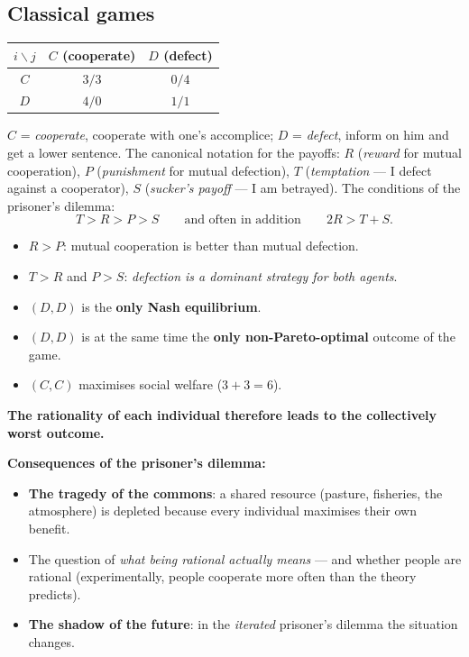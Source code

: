 \documentclass[11pt,a4paper]{article}
\theoremstyle{definition}
\begin{document}
\subsection{Classical games}

\begin{defbox}
\begin{center}
\begin{tabular}{c|cc}
$i \backslash j$ & $C$ (cooperate) & $D$ (defect) \\
\hline
$C$ & $3/3$ & $0/4$ \\
$D$ & $4/0$ & $1/1$ \\
\end{tabular}
\end{center}
$C$ = \emph{cooperate}, cooperate with one's accomplice; $D$ = \emph{defect}, inform on him and get a
lower sentence. The canonical notation for the payoffs: $R$ (\emph{reward} for mutual cooperation),
$P$ (\emph{punishment} for mutual defection), $T$ (\emph{temptation} --- I defect against a
cooperator), $S$ (\emph{sucker's payoff} --- I am betrayed). The conditions of the prisoner's dilemma:
\[
T > R > P > S \qquad\text{and often in addition}\qquad 2R > T + S .
\]
\begin{itemize}
\item $R > P$: mutual cooperation is better than mutual defection.
\item $T > R$ and $P > S$: \emph{defection is a dominant strategy for both agents}.
\item $(D,D)$ is the \textbf{only Nash equilibrium}.
\item $(D,D)$ is at the same time the \textbf{only non-Pareto-optimal} outcome of the game.
\item $(C,C)$ maximises social welfare ($3+3=6$).
\end{itemize}
\textbf{The rationality of each individual therefore leads to the collectively worst outcome.}
\end{defbox}

\textbf{Consequences of the prisoner's dilemma:}
\begin{itemize}
\item \textbf{The tragedy of the commons}: a shared resource
  (pasture, fisheries, the atmosphere) is depleted because every individual maximises their own
  benefit.
\item The question of \emph{what being rational actually means} --- and whether people are rational
  (experimentally, people cooperate more often than the theory predicts).
\item \textbf{The shadow of the future}: in the \emph{iterated} prisoner's dilemma the situation
  changes.
\end{itemize}
\end{document}
